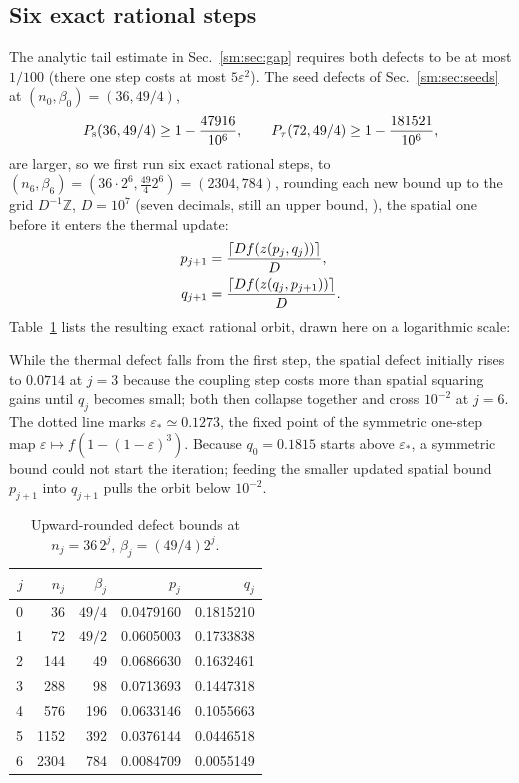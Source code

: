 \subsection{Six exact rational steps}
\label{sm:sec:orbit}

The analytic tail estimate in Sec.~\ref{sm:sec:gap} requires both
defects to be at most $1/100$ (there one step costs at most
$5\varepsilon^2$). The seed defects of Sec.~\ref{sm:sec:seeds} at
$(n_0,\beta_0)=(36,49/4)$,
\begin{equation}
 P_{\mathrm s}(36,49/4)\ge1-\frac{47916}{10^6},
 \qquad
 P_{\tau}(72,49/4)\ge1-\frac{181521}{10^6},
 \label{sm:eq:initial}
\end{equation}
are larger, so we first run six exact rational steps, to
$(n_6,\beta_6)=(36\cdot2^6,\tfrac{49}{4}2^6)=(2304,784)$, rounding each
new bound up to the grid $D^{-1}\mathbb Z$, $D=10^7$ (seven decimals,
still an upper bound, \ceilglyph), the spatial one before it enters the
thermal update:
\begin{align}
 p_{j+1}&=\frac{\left\lceil Df(z(p_j,q_j))\right\rceil}{D},
 \notag\\
 q_{j+1}&=\frac{\left\lceil Df(z(q_j,p_{j+1}))\right\rceil}{D}.
 \label{sm:eq:rounding}
\end{align}
Table~\ref{sm:tab:orbit} lists the resulting exact rational orbit, drawn
here on a logarithmic scale:
\begin{proofdiagram}
\end{proofdiagram}
While the thermal defect falls from the first step, the spatial defect
initially rises to $0.0714$ at $j=3$ because the coupling step costs
more than spatial squaring gains until $q_j$ becomes small; both then
collapse together and cross $10^{-2}$ at $j=6$. The dotted line marks
$\varepsilon_*\simeq0.1273$, the fixed point of the symmetric one-step
map $\varepsilon\mapsto f(1-(1-\varepsilon)^3)$. Because $q_0=0.1815$
starts above $\varepsilon_*$, a symmetric bound could not start the
iteration; feeding the smaller updated spatial bound $p_{j+1}$ into
$q_{j+1}$ pulls the orbit below $10^{-2}$.

\begin{table}[ht]
 \centering
 \caption{Upward-rounded defect bounds at
 $n_j=36\,2^j$, $\beta_j=(49/4)2^j$.}
 \label{sm:tab:orbit}
 \begin{tabular}{rrrrr}
  \toprule
  $j$&$n_j$&$\beta_j$&$p_j$&$q_j$\\
  \midrule
  0&36&$49/4$&0.0479160&0.1815210\\
  1&72&$49/2$&0.0605003&0.1733838\\
  2&144&49&0.0686630&0.1632461\\
  3&288&98&0.0713693&0.1447318\\
  4&576&196&0.0633146&0.1055663\\
  5&1152&392&0.0376144&0.0446518\\
  6&2304&784&0.0084709&0.0055149\\
  \bottomrule
 \end{tabular}
\end{table}

